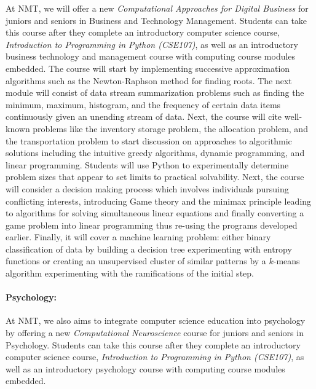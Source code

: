 At NMT, we will offer a new \textit{Computational Approaches for Digital Business} for juniors and seniors in Business and Technology Management. Students can take this course after they complete an introductory computer science course, \textit{Introduction to Programming in Python (CSE107)}, as well as an introductory business technology and management course with computing course modules embedded. The course will start by implementing successive approximation algorithms such as the Newton-Raphson method for finding roots. The next module will consist of data stream summarization problems such as finding the minimum, maximum, histogram, and the frequency of certain data items continuously given an unending stream of data. Next, the course will cite well-known problems like the inventory storage problem, the allocation problem, and the transportation problem to start discussion on approaches to algorithmic solutions including the intuitive greedy algorithms, dynamic programming, and linear programming.  Students will use Python to experimentally determine 
problem sizes that appear to set limits to practical solvability. Next, the course will consider a decision making process which involves individuals pursuing conflicting interests, introducing Game theory and the minimax principle leading to algorithms for solving simultaneous linear equations and finally converting a game problem  into linear programming thus re-using the programs developed earlier. Finally, it will cover a machine learning problem: either binary classification of data by building a decision tree experimenting with entropy functions or creating an unsupervised cluster of similar patterns by a $k$-means algorithm experimenting with the ramifications of the initial step.

\paragraph{Psychology:}
At NMT, we also aims to integrate computer science education into psychology by offering a new \textit{Computational Neuroscience} course for juniors and seniors in Psychology. Students can take this course after they complete an introductory computer science course, \textit{Introduction to Programming in Python (CSE107)}, as well as an introductory psychology course with computing course modules embedded.